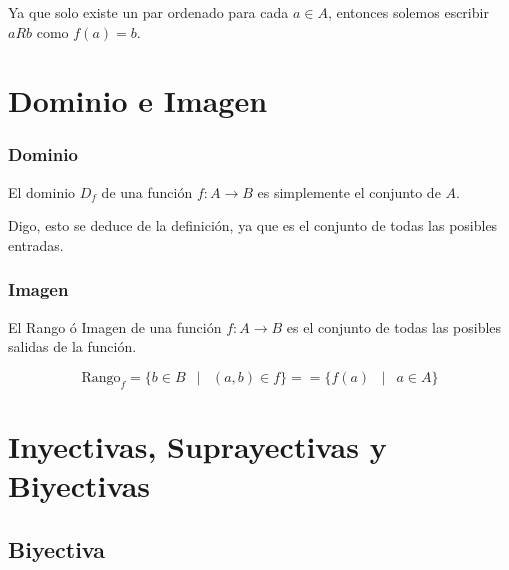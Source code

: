 \documentclass[12pt]{report}                                    %
\DeclareMathOperator \Space {\quad}                             %
\DeclareMathOperator \MiniSpace {\;}                            %
\newcommand \Such {\MiniSpace|\MiniSpace}                       %
\begin{document}
        Ya que solo existe un par ordenado para cada $a \in A$, entonces solemos escribir 
        $aRb$ como $f(a) = b$.







    \clearpage
    \section{Dominio e Imagen}
        
        \subsubsection*{Dominio}

            El dominio $D_f$ de una función $f : A \to B$ es simplemente el conjunto de $A$.

            Digo, esto se deduce de la definición, ya que es el conjunto de todas las posibles
            entradas.

        \subsubsection*{Imagen}

            El Rango ó Imagen de una función $f : A \to B$ es el conjunto de todas las posibles salidas
            de la función.

            \begin{equation}
                \text{Rango}_f = \{ b \in B \Such (a,b) \in f \} = = \{ f(a) \Such a \in A \}
            \end{equation}






    \clearpage
    \section{Inyectivas, Suprayectivas y Biyectivas}

        \subsection{Biyectiva}
\end{document}
